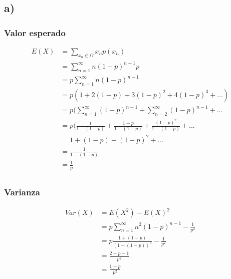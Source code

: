 \documentclass{article}
\begin{document}
\begin{tcolorbox}[breakable]
    \subsection*{a)}
    \subsubsection*{Valor esperado}
    \begin{align*}
        E(X) 
        &= \sum_{x_n \in \Omega} x_np(x_n) \\
        &= \sum_{n=1}^\infty n(1-p)^{n-1}p \\
        &= p\sum_{n=1}^\infty n(1-p)^{n-1} \\ 
        &= p(1+2(1-p)+3(1-p)^2+4(1-p)^3+...) \\
        &= p(\sum_{n=1}^\infty (1-p)^{n-1} + \sum_{n=2}^\infty (1-p)^{n-1} + ... \\
        &= p(\tfrac{1}{1-(1-p)} + \tfrac{1-p}{1-(1-p)} + \tfrac{(1-p)^2}{1-(1-p)} +... \\
        &= 1+(1-p)+(1-p)^2+... \\
        &= \frac{1}{1-(1-p)} \\
        &= \frac{1}{p} \\
    \end{align*}
    \subsubsection*{Varianza}
    \begin{align*}
        Var(X) 
        &= E(X^2)-E(X)^2 \\
        &= p\sum_{n=1}^\infty n^2(1-p)^{n-1} - \frac{1}{p^2} \\
        &= p\frac{1+(1-p)}{(1-(1-p))^3} - \frac{1}{p^2} \\
        &= \frac{2-p-1}{p^2} \\
        &= \frac{1-p}{p^2}
    \end{align*}

\end{tcolorbox}
\end{document}
